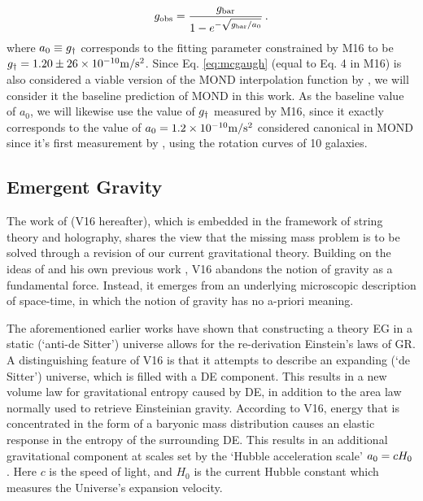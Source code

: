 \documentclass[usenatbib]{mnras}
\newcommand*{\E}[1]{\times 10^{#1}}
\newcommand{\un}[1]{_{\rm #1}}
\begin{document}
\begin{equation}\label{eq:mcgaugh}
	g\un{obs} = \frac{g\un{bar}}{1 - e^{-\sqrt{g\un{bar}/a_0}}} \, .
\end{equation}
where $a_0 \equiv g\un{\dagger}$ corresponds to the fitting parameter constrained by M16 to be $g\un{\dagger}=1.20\pm26\E{-10} {\rm m/s^2}$. Since Eq. \ref{eq:mcgaugh} (equal to Eq. 4 in M16) is also considered a viable version of the MOND interpolation function by \cite{milgrom2008}, we will consider it the baseline prediction of MOND in this work. As the baseline value of $a_0$, we will likewise use the value of $g\un{\dagger}$ measured by M16, since it exactly corresponds to the value of $a_0=1.2\E{-10} {\rm m/s^2}$ considered canonical in MOND since it's first measurement by \cite{begeman1991}, using the rotation curves of 10 galaxies.

\subsection{Emergent Gravity}
\label{sec:EG}

The work of \cite{verlinde2016} (V16 hereafter), which is embedded in the framework of string theory and holography, shares the view that the missing mass problem is to be solved through a revision of our current gravitational theory. Building on the ideas of \cite{jacobson1995,jacobson2016,padmanabhan2010,faulkner2015} and his own previous work \cite[]{verlinde2011}, V16 abandons the notion of gravity as a fundamental force. Instead, it emerges from an underlying microscopic description of space-time, in which the notion of gravity has no a-priori meaning.

The aforementioned earlier works have shown that constructing a theory EG in a static (`anti-de Sitter') universe allows for the re-derivation Einstein's laws of GR. A distinguishing feature of V16 is that it attempts to describe an expanding (`de Sitter') universe, which is filled with a DE component. This results in a new volume law for gravitational entropy caused by DE, in addition to the area law normally used to retrieve Einsteinian gravity. According to V16, energy that is concentrated in the form of a baryonic mass distribution causes an elastic response in the entropy of the surrounding DE. This results in an additional gravitational component at scales set by the `Hubble acceleration scale' $a\un{0} = c H_0$. Here $c$ is the speed of light, and $H_0$ is the current Hubble constant which measures the Universe's expansion velocity.
\end{document}
